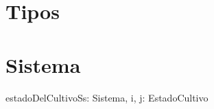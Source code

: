 \documentclass[a4paper]{article}
\begin{document}

\section{Tipos}



\section{Sistema}



\begin{problema}{estadoDelCultivoS}{s: Sistema, i, j: \ent}{EstadoCultivo}
\end{problema}


%
\end{document}
